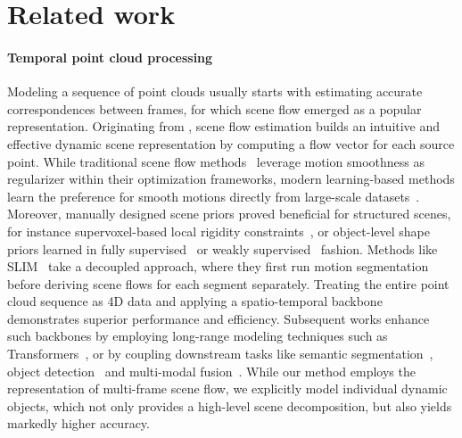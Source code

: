\section{Related work}
\label{sec:related}

\paragraph{Temporal point cloud processing}
Modeling a sequence of point clouds usually starts with estimating accurate correspondences between frames, for which scene flow emerged as a popular representation. Originating from \cite{vedula1999three}, scene flow estimation builds an intuitive and effective dynamic scene representation by computing a flow vector for each source point. While traditional scene flow methods~\cite{wedel2008efficient,vogel20113d,vogel2013piecewise,vogel20153d} leverage motion smoothness as regularizer within their optimization frameworks, modern learning-based methods learn the preference for smooth motions directly from large-scale datasets~\cite{liu2019flownet3d,wu2019pointpwc,puy2020flot,ouyang2021occlusion}. Moreover, manually designed scene priors proved beneficial for structured scenes, for instance supervoxel-based local rigidity constraints~\cite{li2021hcrf}, or object-level shape priors learned in fully supervised~\cite{behl2019pointflownet} or weakly supervised~\cite{gojcic2021weakly} fashion.
Methods like SLIM~\cite{baur2021slim} take a decoupled approach, where they first run motion segmentation before deriving scene flows for each segment separately.
Treating the entire point cloud sequence as 4D data and applying a spatio-temporal backbone~\cite{liu2019meteornet,choy2019Minkowski,fan2020pstnet} demonstrates superior performance and efficiency. Subsequent works enhance such backbones by employing long-range modeling techniques such as Transformers~\cite{vaswani2017attention,fan2021point,yang20213d}, or by coupling downstream tasks like semantic segmentation~\cite{aygun20214d}, object detection~\cite{yang2021auto4d,qi2021offboard} and multi-modal fusion~\cite{piergiovanni20214d}.
While our method employs the representation of multi-frame scene flow, we explicitly model individual dynamic objects, which not only provides a high-level scene decomposition, but also yields markedly higher accuracy.

